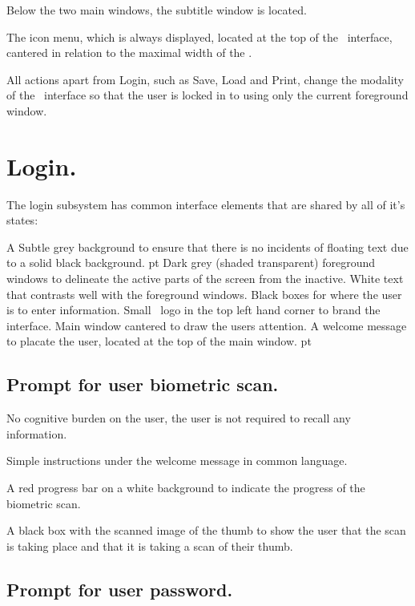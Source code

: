 Below the two main windows, the subtitle window is located.

The icon menu, which is always displayed, located at the top of the \iDesks\ interface, cantered in relation to the maximal width of the \iDesk.


All actions apart from Login, such as Save, Load and Print, change the modality of the \iDesk\ interface so that the user is locked in to using only the current foreground window.

\section{Login.}

The login subsystem has common interface elements that are shared by all of it's states:

\items A Subtle grey background to ensure that there is no incidents of floating text due to a solid black background.
 pt
\items Dark grey (shaded transparent) foreground windows to delineate the active parts of the screen from the inactive.
\items White text that contrasts well with the foreground windows.
\items Black boxes for where the user is to enter information.
\items Small \UOW\ logo in the top left hand corner to brand the interface.
\items Main window cantered to draw the users attention.
\items A welcome message to placate the user, located at the top of the main window.
 pt

\subsection{Prompt for user biometric scan.}

No cognitive burden on the user, the user is not required to recall any information.

Simple instructions under the welcome message in common language.

A red progress bar on a white background to indicate the progress of the biometric scan.

A black box with the scanned image of the thumb to show the user that the scan is taking place and that it is taking a scan of their thumb.

\subsection{Prompt for user password.}

